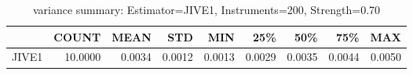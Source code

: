 \begin{table}[ht]
\centering
\caption{variance summary: Estimator=JIVE1, Instruments=200, Strength=0.70}
\begin{tabular}{lrrrrrrrr}
\toprule
 & COUNT & MEAN & STD & MIN & 25\% & 50\% & 75\% & MAX \\
\midrule
JIVE1 & 10.0000 & 0.0034 & 0.0012 & 0.0013 & 0.0029 & 0.0035 & 0.0044 & 0.0050 \\
\bottomrule
\end{tabular}
\end{table}

